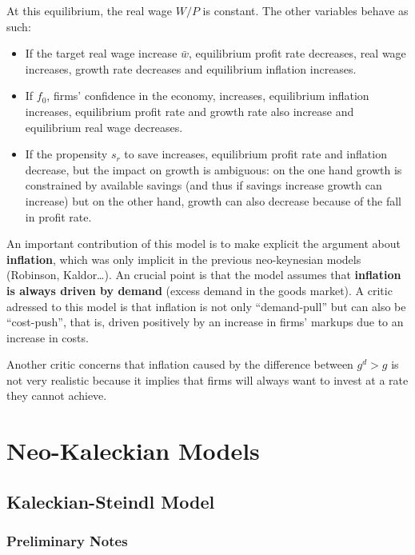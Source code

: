 \documentclass[
  letterpaper,
  DIV=11,
  numbers=noendperiod]{scrreprt}
\begin{document}
At this equilibrium, the real wage \(W/P\) is constant. The other
variables behave as such:

\begin{itemize}
\item
  If the target real wage increase \(\bar{w}\), equilibrium profit rate
  decreases, real wage increases, growth rate decreases and equilibrium
  inflation increases.
\item
  If \(f_0\), firms' confidence in the economy, increases, equilibrium
  inflation increases, equilibrium profit rate and growth rate also
  increase and equilibrium real wage decreases.
\item
  If the propensity \(s_r\) to save increases, equilibrium profit rate
  and inflation decrease, but the impact on growth is ambiguous: on the
  one hand growth is constrained by available savings (and thus if
  savings increase growth can increase) but on the other hand, growth
  can also decrease because of the fall in profit rate.
\end{itemize}

An important contribution of this model is to make explicit the argument
about \textbf{inflation}, which was only implicit in the previous
neo-keynesian models (Robinson, Kaldor\ldots). An crucial point is that
the model assumes that \textbf{inflation is always driven by demand}
(excess demand in the goods market). A critic adressed to this model is
that inflation is not only ``demand-pull'' but can also be
``cost-push'', that is, driven positively by an increase in firms'
markups due to an increase in costs.

Another critic concerns that inflation caused by the difference between
\(g^d>g\) is not very realistic because it implies that firms will
always want to invest at a rate they cannot achieve.

\part{Neo-Kaleckian Models}

\hypertarget{kaleckian-steindl-model}{%
\chapter{Kaleckian-Steindl Model}\label{kaleckian-steindl-model}}

\hypertarget{preliminary-notes}{%
\section{Preliminary Notes}\label{preliminary-notes}}
\end{document}
